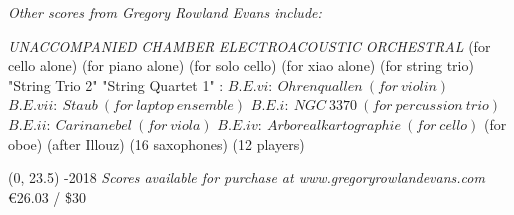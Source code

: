 \documentclass[10pt]{article}
\begin{document}

\begin{center}
\textit{\fontsize{.7cm}{1em}\selectfont Other scores from Gregory Rowland Evans include:} \hfill
\end{center}
\vspace*{4\baselineskip}
{
\begin{center}
\setlength{\columnseprule}{1pt}
\setlength{\columnsep}{6em}

\begin{paracol}{4}
\textit{\fontsize{.5cm}{1em}\selectfont UNACCOMPANIED}
\switchcolumn[1]
\textit{\fontsize{.5cm}{1em}\selectfont CHAMBER}
\switchcolumn[2]
\textit{\fontsize{.5cm}{1em}\selectfont ELECTROACOUSTIC}
\switchcolumn[3]
\textit{\fontsize{.5cm}{1em}\selectfont ORCHESTRAL}
\switchcolumn[0]
 (for cello alone)
\switchcolumn[0]
 (for piano alone)
\switchcolumn[0]
 (for solo cello)
 \switchcolumn[0]
 (for xiao alone)
\switchcolumn[1]
\switchcolumn[1]
\switchcolumn[1]
 (for string trio)
\switchcolumn[1]
 "String Trio 2"
\switchcolumn[1]
 "String Quartet 1"
\switchcolumn[2]
:
\switchcolumn[2]
$B.E.vi: \ Ohrenquallen \ (for \ violin)$
\switchcolumn[2]
$B.E.vii: \ Staub \ (for \ laptop \ ensemble)$
\switchcolumn[2]
$B.E.i: \ NGC \ 3370 \ (for \ percussion \ trio)$
\switchcolumn[2]
$B.E.ii: \ Carinanebel \ (for \ viola)$
\switchcolumn[2]
$B.E.iv: \ Arborealkartographie \ (for \ cello)$
\switchcolumn[2]
 (for oboe)
\switchcolumn[3]
\switchcolumn[3]
 (after Illouz)
\switchcolumn[3]
 (16 saxophones)
\switchcolumn[3]
 (12 players)
 

\end{paracol}
\end{center}
}

\begin{textblock}{23}(0, 23.5)
-2018 \hfill
\textit{Scores available for purchase at www.gregoryrowlandevans.com} \hfill
\euro 26.03 / \$30
\end{textblock}
\end{document}
